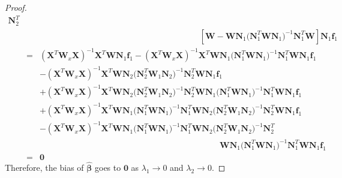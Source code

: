 \documentclass[article,lineno]{biometrika}
\begin{document}
\begin{proof}
\begin{eqnarray*}
\boldsymbol N_2^T \\
&& \hspace{8cm}
\left[\boldsymbol W 
-
\boldsymbol W \boldsymbol N_1 
(\boldsymbol N_1^T  \boldsymbol W \boldsymbol N_1 \boldsymbol)^{-1} 
\boldsymbol N_1^T  \boldsymbol W \right]
\boldsymbol N_{1} \boldsymbol f_1 \\
&=& 
(\boldsymbol X^T  \boldsymbol W_x \boldsymbol X )^{-1} \boldsymbol X^T 
\boldsymbol W \boldsymbol N_{1} \boldsymbol f_1
-
(\boldsymbol X^T  \boldsymbol W_x \boldsymbol X )^{-1} \boldsymbol X^T 
\boldsymbol W \boldsymbol N_1 
(\boldsymbol N_1^T  \boldsymbol W \boldsymbol N_1 \boldsymbol)^{-1} 
\boldsymbol N_1^T  \boldsymbol W  \boldsymbol N_{1} \boldsymbol f_1 \\
&&
-
(\boldsymbol X^T  \boldsymbol W_x \boldsymbol X )^{-1} \boldsymbol X^T 
\boldsymbol W \boldsymbol N_2 
(\boldsymbol N_2^T  \boldsymbol W_1 \boldsymbol N_2 \boldsymbol )^{-1} 
\boldsymbol N_2^T \boldsymbol W \boldsymbol N_{1} \boldsymbol f_1 \\
&&
+
(\boldsymbol X^T  \boldsymbol W_x \boldsymbol X )^{-1} \boldsymbol X^T 
\boldsymbol W
\boldsymbol N_2 
(\boldsymbol N_2^T  \boldsymbol W_1 \boldsymbol N_2 \boldsymbol )^{-1} 
\boldsymbol N_2^T
\boldsymbol W \boldsymbol N_1 
(\boldsymbol N_1^T  \boldsymbol W \boldsymbol N_1 \boldsymbol)^{-1} 
\boldsymbol N_1^T  \boldsymbol W
\boldsymbol N_{1} \boldsymbol f_1 \\
&&
+
(\boldsymbol X^T  \boldsymbol W_x \boldsymbol X )^{-1} \boldsymbol X^T 
\boldsymbol W \boldsymbol N_1 
(\boldsymbol N_1^T  \boldsymbol W \boldsymbol N_1 \boldsymbol)^{-1} 
\boldsymbol N_1^T  \boldsymbol W \boldsymbol N_2 
(\boldsymbol N_2^T  \boldsymbol W_1 \boldsymbol N_2 \boldsymbol )^{-1} 
\boldsymbol N_2^T  \boldsymbol W \boldsymbol N_{1} \boldsymbol f_1  \\
&& 
- 
(\boldsymbol X^T  \boldsymbol W_x \boldsymbol X )^{-1} \boldsymbol X^T 
\boldsymbol W \boldsymbol N_1 
(\boldsymbol N_1^T  \boldsymbol W \boldsymbol N_1 \boldsymbol)^{-1} 
\boldsymbol N_1^T  \boldsymbol W \boldsymbol N_2 
(\boldsymbol N_2^T  \boldsymbol W_1 \boldsymbol N_2 \boldsymbol )^{-1} 
\boldsymbol N_2^T \\ 
&& \hspace{9cm}
\boldsymbol W \boldsymbol N_1 
(\boldsymbol N_1^T  \boldsymbol W \boldsymbol N_1 \boldsymbol)^{-1} 
\boldsymbol N_1^T  \boldsymbol W
\boldsymbol N_{1} \boldsymbol f_1 \\
&= &
\bm 0
\end{eqnarray*}
Therefore, the bias of $\bm {\hat \beta}$ goes to $\bm 0$ as $\lambda_1 \to 0$ and $\lambda_2 \to 0$. 


\end{proof}
\end{document}
